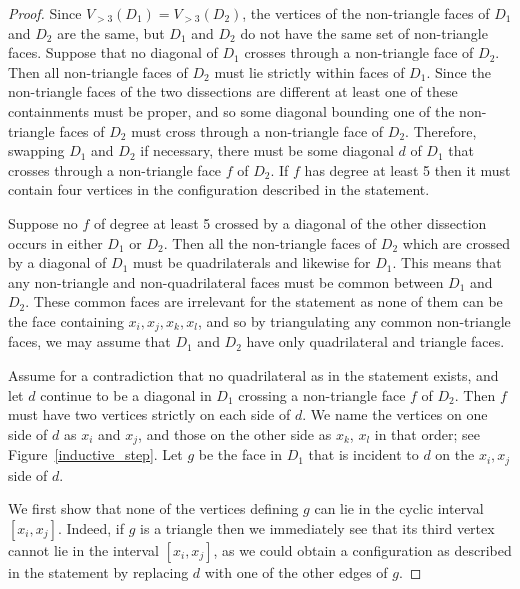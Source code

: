 \documentclass[11pt]{article}
\theoremstyle{remark}
\theoremstyle{definition}
\begin{document}
\begin{proof}
  Since $V_{>3}(D_1) = V_{>3}(D_2)$, the vertices of the non-triangle faces of $D_1$ and $D_2$ are the same, but $D_1$ and $D_2$ do not have the same set of non-triangle faces.
  Suppose that no diagonal of $D_1$ crosses through a non-triangle face of $D_2$.  Then all non-triangle faces of $D_2$ must lie strictly within faces of $D_1$.  Since the non-triangle faces of the two dissections are different at least one of these containments must be proper, and so some diagonal bounding one of the non-triangle faces of $D_2$ must cross through a non-triangle face of $D_2$.  Therefore, swapping $D_1$ and $D_2$ if necessary,  
  there must be some diagonal $d$ of $D_1$ that crosses through a non-triangle face $f$ of $D_2$.
  If $f$ has degree at least 5 then it must contain four vertices in the configuration described in the statement.


Suppose no $f$ of degree at least 5 crossed by a diagonal of the other dissection occurs in either $D_1$ or $D_2$.  Then all the non-triangle faces of $D_2$ which are crossed by a diagonal of $D_1$ must be quadrilaterals and likewise for $D_1$.  This means that any non-triangle and non-quadrilateral faces must be common between $D_1$ and $D_2$.  These common faces are irrelevant for the statement as none of them can be the face containing $x_i, x_j, x_k, x_l$, and so by triangulating any common non-triangle faces, we may assume that $D_1$ and $D_2$ have only quadrilateral and triangle faces.

Assume for a contradiction that no quadrilateral as in the statement exists, and let $d$ continue to be a diagonal in $D_1$ crossing a non-triangle face $f$ of $D_2$. Then $f$ must have two vertices strictly on each side of $d$. We name the vertices on one side of $d$ as $x_i$ and $x_j$, and those on the other side as $x_k$, $x_l$ in that order; see Figure~\ref{inductive_step}.  Let $g$ be the face in $D_1$ that is incident to $d$ on the $x_i, x_j$ side of $d$.

We first show that none of the vertices defining $g$ can lie in the cyclic interval $[x_i,x_j]$. Indeed, if $g$ is a triangle then we immediately see that its third vertex cannot lie in the interval $[x_i,x_j]$, as we could obtain a configuration as described in the statement by replacing $d$ with one of the other edges of $g$.


\end{proof}
\end{document}
